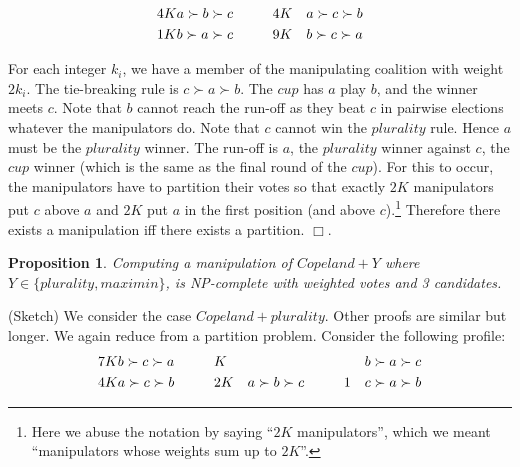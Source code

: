 \documentclass{ecai2012}
\newcommand{\winner}[2]{\mbox{$#1 + #2$}}
\newtheorem{proposition}{Proposition}
\newcommand{\myproof}{\vspace{-3mm}\noindent {\bf Proof:\ \ }}
\newcommand{\myqed}{\mbox{$\Box$}}
\begin{document}
\vspace{-5mm}\begin{align*}
4K&a \succ b \succ c \hspace{10mm}
4K&a \succ c \succ b \\
1K&b \succ a \succ c \hspace{10mm}
9K&b \succ c \succ a
\end{align*}

\vspace{-2mm}For each
integer $k_i$, we have a member of the manipulating coalition
with weight $2k_i$.
The tie-breaking rule is $c \succ a \succ b$.
The $cup$ has $a$ play $b$, and the winner
meets $c$. Note that $b$ cannot reach the
run-off as they beat $c$ in pairwise
elections whatever the manipulators do.
Note that $c$ cannot win the $plurality$
rule. Hence $a$ must be the $plurality$ winner.
The run-off is $a$, the $plurality$ winner
against $c$, the $cup$ winner (which is the
same as the final round of the $cup$).
For this to occur, the manipulators have to partition
their votes so that exactly $2K$ manipulators put $c$
above $a$ and $2K$ %
put $a$
in the first position (and above $c$).\footnote{Here we abuse the notation by saying ``$2K$ manipulators'', which we meant ``manipulators whose weights sum up to $2K$''.} Therefore there exists a manipulation
iff there exists a partition.
\myqed.

\vspace{-3mm}
\begin{proposition}
Computing a manipulation of $\winner{Copeland}{Y}$ where
$Y \in \{plurality, maximin\}$,
is NP-complete with weighted votes and 3 candidates.
\end{proposition}
\myproof (Sketch)
We consider the case $\winner{Copeland}{plurality}$.
Other proofs are similar but longer.
We again reduce from a  {\sc  partition} problem.
Consider the following profile:
\vspace{-2mm}\begin{eqnarray*}
7K&b \succ c \succ a \hspace{10mm}
K&b \succ a \succ c \\
4K&a \succ c \succ b \hspace{10mm}
2K&a \succ b \succ c \hspace{10mm}
1\ \ \  c \succ a \succ b
\end{eqnarray*}
\end{document}
